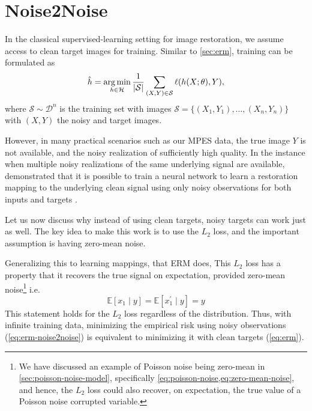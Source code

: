 \section{Noise2Noise}
In the classical supervised-learning setting for image restoration, we assume access to clean target images for training. Similar to \cref{sec:erm}, training can be formulated as
\begin{equation}
    \hat{h} = \operatorname*{arg\,min}_{h \in \mathcal{H}} \frac{1}{\lvert \mathcal{S} \rvert} \sum_{(X, Y) \in \mathcal{S}} \ell(h(X; \theta), Y),
\end{equation}
where $\mathcal{S} \sim \mathcal{D}^n$ is the training set with images $\mathcal{S} = \{(X_1, Y_1), \dots, (X_n, Y_n)\}$ with $(X, Y)$  the noisy and target images.

However, in many practical scenarios such as our \gls{MPES} data, the true image $Y$ is not available, and the noisy realization of sufficiently high quality. In the instance when multiple noisy realizations of the same underlying signal are available, \citeauthor{lehtinenNoise2NoiseLearningImage2018} demonstrated that it is possible to train a neural network to learn a restoration mapping to the underlying clean signal using only noisy observations for both inputs and targets \cite{lehtinenNoise2NoiseLearningImage2018}.

Let us now discuss why instead of using clean targets, noisy targets can work just as well. The key idea to make this work is to use the $L_2$ loss, and the important assumption is having zero-mean noise. 


Generalizing this to learning mappings, that \gls{ERM} does, 
This $L_2$ loss has a property that it recovers the true signal on expectation, provided zero-mean noise\footnote{We have discussed an example of Poisson noise being zero-mean in \cref{sec:poisson-noise-model}, specifically \cref{eq:poisson-noise,eq:zero-mean-noise}, and hence, the $L_2$ loss could also recover, on expectation, the true value of a Poisson noise corrupted variable.} i.e.\
\begin{equation*}
    \mathbb{E}[x_1 \mid y] = \mathbb{E}[x_1^\prime \mid y] = y
\end{equation*}
This statement holds for the $L_2$ loss regardless of the distribution. Thus, with infinite training data, minimizing the empirical risk using noisy observations (\cref{eq:erm-noise2noise}) is equivalent to minimizing it with clean targets (\cref{eq:erm}). 


